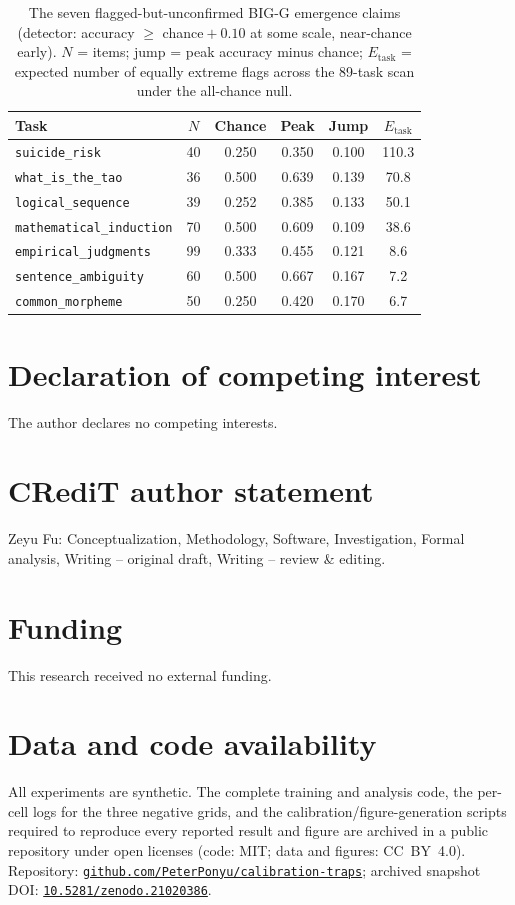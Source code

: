 \documentclass[11pt]{article}
\theoremstyle{plain}
\theoremstyle{definition}
\begin{document}
\begin{table}[htbp]
\centering
\caption{The seven flagged-but-unconfirmed BIG-G emergence claims (detector: accuracy
$\geq$ chance${}+0.10$ at some scale, near-chance early). $N$ = items; jump = peak
accuracy minus chance; $E_{\mathrm{task}}$ = expected number of equally extreme flags
across the 89-task scan under the all-chance null.}
\label{tab:bigbench-unpowered}
\small
\begin{tabular}{lccccc}
\toprule
Task & $N$ & Chance & Peak & Jump & $E_{\mathrm{task}}$ \\
\midrule
\texttt{suicide\_risk}           & 40 & 0.250 & 0.350 & 0.100 & 110.3 \\
\texttt{what\_is\_the\_tao}      & 36 & 0.500 & 0.639 & 0.139 & 70.8 \\
\texttt{logical\_sequence}       & 39 & 0.252 & 0.385 & 0.133 & 50.1 \\
\texttt{mathematical\_induction} & 70 & 0.500 & 0.609 & 0.109 & 38.6 \\
\texttt{empirical\_judgments}    & 99 & 0.333 & 0.455 & 0.121 & 8.6 \\
\texttt{sentence\_ambiguity}     & 60 & 0.500 & 0.667 & 0.167 & 7.2 \\
\texttt{common\_morpheme}        & 50 & 0.250 & 0.420 & 0.170 & 6.7 \\
\bottomrule
\end{tabular}
\end{table}

\section*{Declaration of competing interest}

The author declares no competing interests.

\section*{CRediT author statement}

Zeyu Fu: Conceptualization, Methodology, Software, Investigation, Formal
analysis, Writing -- original draft, Writing -- review \& editing.

\section*{Funding}
This research received no external funding.

\section*{Data and code availability}
All experiments are synthetic. The complete training and analysis code, the per-cell
logs for the three negative grids, and the calibration/figure-generation scripts required
to reproduce every reported result and figure are archived in a public repository under
open licenses (code: MIT; data and figures: CC~BY~4.0). Repository:
\href{https://github.com/PeterPonyu/calibration-traps}{\nolinkurl{github.com/PeterPonyu/calibration-traps}};
archived snapshot DOI:
\href{https://doi.org/10.5281/zenodo.21020386}{\texttt{10.5281/zenodo.21020386}}.
\end{document}
